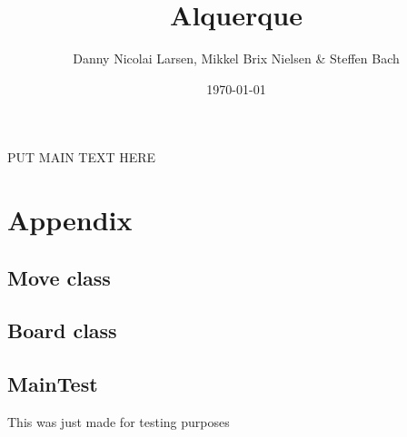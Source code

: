 \documentclass[12pt, a4paper]{article}
\title{Alquerque}
\author{Danny Nicolai Larsen, Mikkel Brix Nielsen \& Steffen Bach}
\date{\today}
\begin{document}
\maketitle
\newpage
\tableofcontents
\newpage

PUT MAIN TEXT HERE

\newpage

\section{Appendix}
\subsection{Move class}

\subsection{Board class}

\subsection{MainTest}
This was just made for testing purposes

\end{document}
